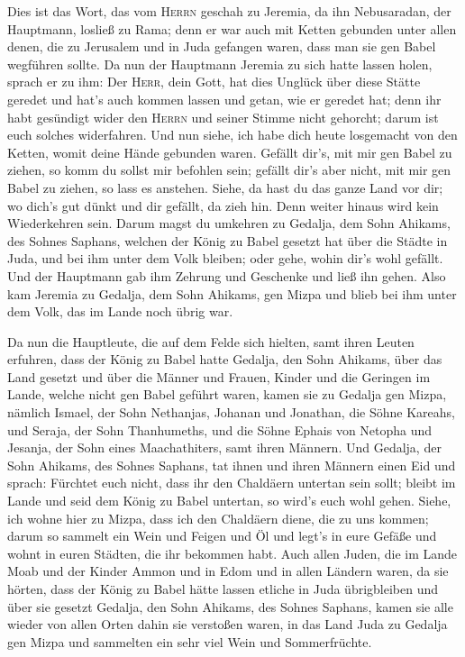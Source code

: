  Dies ist das Wort, das vom \textsc{Herrn} geschah zu
Jeremia, da ihn Nebusaradan, der Hauptmann, losließ zu Rama; denn er war
auch mit Ketten gebunden unter allen denen, die zu Jerusalem und in Juda
gefangen waren, dass man sie gen Babel wegführen sollte. 
Da nun der Hauptmann Jeremia zu sich hatte lassen holen, sprach er zu
ihm: Der \textsc{Herr}, dein Gott, hat dies Unglück über diese Stätte
geredet  und hat's auch kommen lassen und getan, wie er
geredet hat; denn ihr habt gesündigt wider den \textsc{Herrn} und seiner
Stimme nicht gehorcht; darum ist euch solches widerfahren.
 Und nun siehe, ich habe dich heute losgemacht von den
Ketten, womit deine Hände gebunden waren. Gefällt dir's, mit mir gen
Babel zu ziehen, so komm du sollst mir befohlen sein; gefällt dir's aber
nicht, mit mir gen Babel zu ziehen, so lass es anstehen. Siehe, da hast
du das ganze Land vor dir; wo dich's gut dünkt und dir gefällt, da zieh
hin.  Denn weiter hinaus wird kein Wiederkehren sein.
Darum magst du umkehren zu Gedalja, dem Sohn Ahikams, des Sohnes
Saphans, welchen der König zu Babel gesetzt hat über die Städte in Juda,
und bei ihm unter dem Volk bleiben; oder gehe, wohin dir's wohl gefällt.
Und der Hauptmann gab ihm Zehrung und Geschenke und ließ ihn gehen.
 Also kam Jeremia zu Gedalja, dem Sohn Ahikams, gen Mizpa
und blieb bei ihm unter dem Volk, das im Lande noch übrig war.

 Da nun die Hauptleute, die auf dem Felde sich hielten,
samt ihren Leuten erfuhren, dass der König zu Babel hatte Gedalja, den
Sohn Ahikams, über das Land gesetzt und über die Männer und Frauen,
Kinder und die Geringen im Lande, welche nicht gen Babel geführt waren,
 kamen sie zu Gedalja gen Mizpa, nämlich Ismael, der Sohn
Nethanjas, Johanan und Jonathan, die Söhne Kareahs, und Seraja, der Sohn
Thanhumeths, und die Söhne Ephais von Netopha und Jesanja, der Sohn
eines Maachathiters, samt ihren Männern.  Und Gedalja, der
Sohn Ahikams, des Sohnes Saphans, tat ihnen und ihren Männern einen Eid
und sprach: Fürchtet euch nicht, dass ihr den Chaldäern untertan sein
sollt; bleibt im Lande und seid dem König zu Babel untertan, so wird's
euch wohl gehen.  Siehe, ich wohne hier zu Mizpa, dass
ich den Chaldäern diene, die zu uns kommen; darum so sammelt ein Wein
und Feigen und Öl und legt's in eure Gefäße und wohnt in euren Städten,
die ihr bekommen habt.  Auch allen Juden, die im Lande
Moab und der Kinder Ammon und in Edom und in allen Ländern waren, da sie
hörten, dass der König zu Babel hätte lassen etliche in Juda
übrigbleiben und über sie gesetzt Gedalja, den Sohn Ahikams, des Sohnes
Saphans,  kamen sie alle wieder von allen Orten dahin sie
verstoßen waren, in das Land Juda zu Gedalja gen Mizpa und sammelten ein
sehr viel Wein und Sommerfrüchte.


